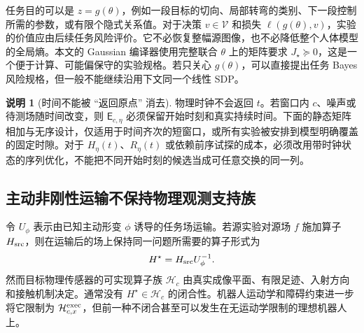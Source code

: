 \documentclass[11pt,a4paper]{article}
\numberwithin{equation}{section}
\theoremstyle{definition}
\newtheorem{remark}[theorem]{说明}
\begin{document}
任务目的可以是 $z=g(\theta)$，例如一段目标的切向、局部转弯的类别、下一段控制所需的参数，或有限个隐式关系值。对于决策 $v\in\mathcal V$ 和损失 $\ell(g(\theta),v)$，实验的价值应由后续任务风险评价。它不必恢复整幅源图像，也不必降低整个人体模型的全局熵。本文的 Gaussian 编译器使用完整联合 $\theta$ 上的矩阵要求 $J_\star\succeq0$，这是一个便于计算、可能偏保守的实验规格。若只关心 $g(\theta)$，可以直接提出任务 Bayes 风险规格，但一般不能继续沿用下文同一个线性 SDP。

\begin{remark}[时间不能被 ``返回原点'' 消去]
\label{cmp:time}
物理时钟不会返回 $t$。若窗口内 $c$、噪声或待测场随时间改变，则 $\mathsf E_{c,\eta}$ 必须保留开始时刻和真实持续时间。下面的静态矩阵相加与无序设计，仅适用于时间齐次的短窗口，或所有实验被安排到模型明确覆盖的固定时隙。对于 $H_\eta(t)$、$R_\eta(t)$ 或依赖前序试探的成本，必须改用带时钟状态的序列优化，不能把不同开始时刻的候选当成可任意交换的同一列。
\end{remark}

\subsection{主动非刚性运输不保持物理观测支持族}
\label{cmp:nonclosure}

令 $U_\phi$ 表示由已知主动形变 $\phi$ 诱导的任务场运输。若源实验对源场 $f$ 施加算子 $H_{\rm src}$，则在运输后的场上保持同一问题所需要的算子形式为
\begin{equation}
 H^\star=H_{\rm src}U_\phi^{-1}.
 \label{cmp:transported-operator}
\end{equation}
然而目标物理传感器的可实现算子族 $\mathcal H_c$ 由真实成像平面、有限足迹、入射方向和接触机制决定。通常没有 $H^\star\in\mathcal H_c$ 的闭合性。机器人运动学和障碍约束进一步将它限制为 $\mathcal H_{c,x}^{\rm exec}$，但前一种不闭合甚至可以发生在无运动学限制的理想机器人上。
\end{document}
